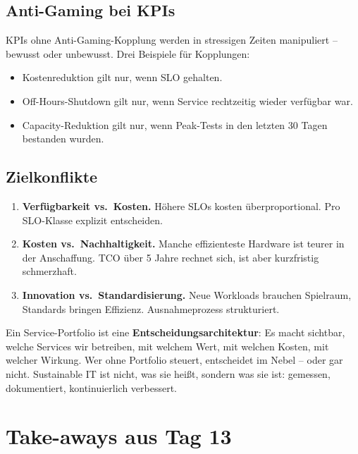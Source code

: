 \documentclass[11pt,a4paper,oneside]{article}
\begin{document}
\subsection{Anti-Gaming bei KPIs}

KPIs ohne Anti-Gaming-Kopplung werden in stressigen Zeiten manipuliert -- bewusst oder unbewusst. Drei Beispiele für Kopplungen:

\begin{itemize}
  \item Kostenreduktion gilt nur, wenn SLO gehalten.
  \item Off-Hours-Shutdown gilt nur, wenn Service rechtzeitig wieder verfügbar war.
  \item Capacity-Reduktion gilt nur, wenn Peak-Tests in den letzten 30 Tagen bestanden wurden.
\end{itemize}

\subsection{Zielkonflikte}

\begin{enumerate}
  \item \textbf{Verfügbarkeit vs.\ Kosten.} Höhere SLOs kosten überproportional. Pro SLO-Klasse explizit entscheiden.
  \item \textbf{Kosten vs.\ Nachhaltigkeit.} Manche effizienteste Hardware ist teurer in der Anschaffung. TCO über 5 Jahre rechnet sich, ist aber kurzfristig schmerzhaft.
  \item \textbf{Innovation vs.\ Standardisierung.} Neue Workloads brauchen Spielraum, Standards bringen Effizienz. Ausnahmeprozess strukturiert.
\end{enumerate}

\begin{merkbox}
Ein Service-Portfolio ist eine \textbf{Entscheidungsarchitektur}: Es macht sichtbar, welche Services wir betreiben, mit welchem Wert, mit welchen Kosten, mit welcher Wirkung. Wer ohne Portfolio steuert, entscheidet im Nebel -- oder gar nicht. Sustainable IT ist nicht, was sie heißt, sondern was sie ist: gemessen, dokumentiert, kontinuierlich verbessert.
\end{merkbox}

\section{Take-aways aus Tag 13}
\end{document}
